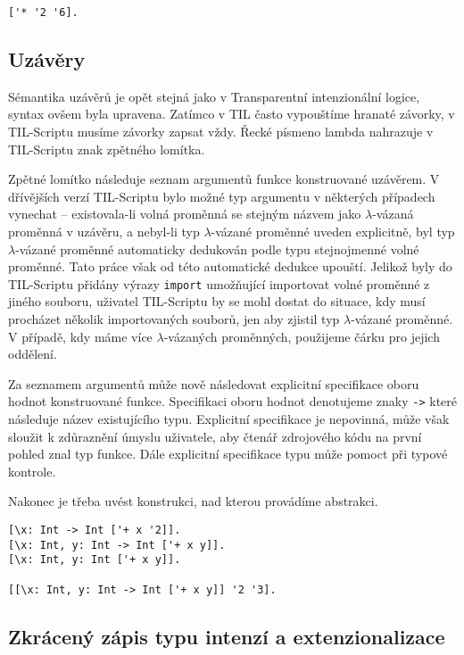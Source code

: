 \begin{lstlisting}[caption={Příklad využití kompozice}]
['* '2 '6].
\end{lstlisting}

\subsection{Uzávěry}

Sémantika uzávěrů je opět stejná jako v Transparentní intenzionální logice, syntax ovšem byla
upravena. Zatímco v TIL často vypouštíme hranaté závorky, v TIL-Scriptu musíme závorky zapsat vždy.
Řecké písmeno lambda nahrazuje v TIL-Scriptu znak zpětného lomítka.

Zpětné lomítko následuje seznam argumentů funkce konstruované uzávěrem. V dřívějších verzí
TIL-Scriptu bylo možné typ argumentu v některých případech vynechat -- existovala-li volná proměnná
se stejným názvem jako $\lambda$-vázaná proměnná v uzávěru, a nebyl-li typ $\lambda$-vázané
proměnné uveden explicitně, byl typ $\lambda$-vázané proměnné automaticky dedukován podle typu
stejnojmenné volné proměnné. Tato práce však od této automatické dedukce upouští. Jelikož byly
do TIL-Scriptu přidány výrazy \lstinline{import} umožňující importovat volné proměnné z jiného
souboru, uživatel TIL-Scriptu by se mohl dostat do situace, kdy musí procházet několik importovaných
souborů, jen aby zjistil typ $\lambda$-vázané proměnné. V případě, kdy máme více $\lambda$-vázaných
proměnných, použijeme čárku pro jejich oddělení.

Za seznamem argumentů může nově následovat explicitní specifikace oboru hodnot konstruované funkce.
Specifikaci oboru hodnot denotujeme znaky \lstinline{->} které následuje název existujícího typu.
Explicitní specifikace je nepovinná, může však sloužit k zdůraznění úmyslu uživatele, aby čtenář
zdrojového kódu na první pohled znal typ funkce. Dále explicitní specifikace typu může pomoct při
typové kontrole.

Nakonec je třeba uvést konstrukci, nad kterou provádíme abstrakci.

\begin{lstlisting}[caption={Příklad využití uzávěrů}]
[\x: Int -> Int ['+ x '2]].
[\x: Int, y: Int -> Int ['+ x y]].
[\x: Int, y: Int ['+ x y]].

[[\x: Int, y: Int -> Int ['+ x y]] '2 '3].
\end{lstlisting}

\subsection{Zkrácený zápis typu intenzí a extenzionalizace}

